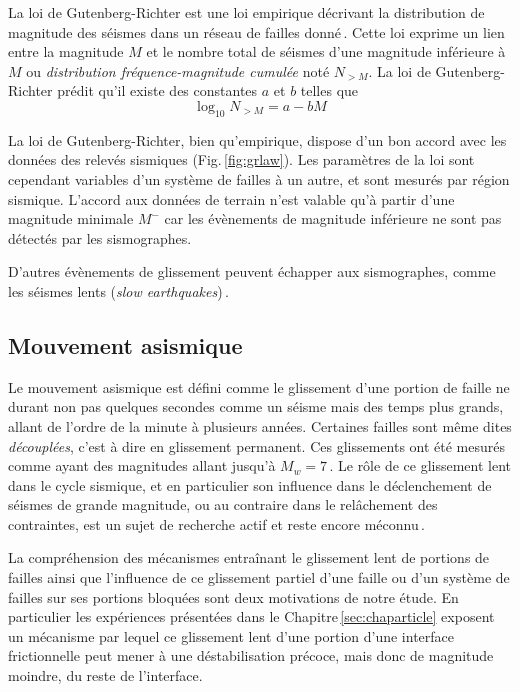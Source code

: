 La loi de Gutenberg-Richter est une loi empirique décrivant la distribution de magnitude des séismes dans un réseau de failles donné\,\cite{gutenberg_frequency_1944}. Cette loi exprime un lien entre la magnitude $M$ et le nombre total de séismes d'une magnitude inférieure à $M$ ou \textit{distribution fréquence-magnitude cumulée} noté $N_{>M}$. La loi de Gutenberg-Richter prédit qu'il existe des constantes $a$ et $b$ telles que
\begin{equation}
\log_{10}N_{>M}=a-bM
\label{eq:grlaw}
\end{equation}


La loi de Gutenberg-Richter, bien qu'empirique, dispose d'un bon accord avec les données des relevés sismiques (Fig.\,\ref{fig:grlaw}). Les paramètres de la loi sont cependant variables d'un système de failles à un autre, et sont mesurés par région sismique. L'accord aux données de terrain n'est valable qu'à partir d'une magnitude minimale $M^-$ car les évènements de magnitude inférieure ne sont pas détectés par les sismographes.

D'autres évènements de glissement peuvent échapper aux sismographes, comme les séismes lents (\textit{slow earthquakes})\,\cite{beroza_searching_1990}.
\vspace{1cm}
\pagebreak

\subsection{Mouvement asismique}

Le mouvement asismique est défini comme le glissement d'une portion de faille ne durant non pas quelques secondes comme un séisme mais des temps plus grands, allant de l'ordre de la minute à plusieurs années. Certaines failles sont même dites \textit{découplées}, c'est à dire en glissement permanent. Ces glissements ont été mesurés comme ayant des magnitudes allant jusqu'à $M_w=7$\,\cite{liu_recurrent_2015}. Le rôle de ce glissement lent dans le cycle sismique, et en particulier son influence dans le déclenchement de séismes de grande magnitude, ou au contraire dans le relâchement des contraintes, est un sujet de recherche actif et reste encore méconnu\,\cite{harris_large_2017, radiguet_triggering_2016,burgmann_geophysics_2018, leeman_frictional_2018,tan_connecting_2020}.


La compréhension des mécanismes entraînant le glissement lent de portions de failles ainsi que l'influence de ce glissement partiel d'une faille ou d'un système de failles sur ses portions bloquées sont deux motivations de notre étude. En particulier les expériences présentées dans le Chapitre\,\ref{sec:chaparticle} exposent un mécanisme par lequel ce glissement lent d'une portion d'une interface frictionnelle peut mener à une déstabilisation précoce, mais donc de magnitude moindre, du reste de l'interface.







